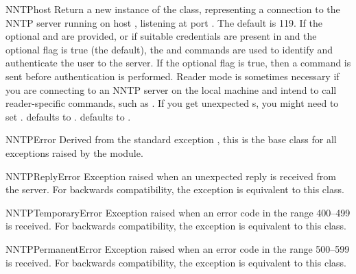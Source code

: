 \begin{classdesc}{NNTP}{host}
Return a new instance of the  class, representing a
connection to the NNTP server running on host , listening at
port .  The default  is 119.  If the optional
 and  are provided, 
or if suitable credentials are present in  and the
optional flag  is true (the default),
the  and  commands are used to
identify and authenticate the user to the server.  If the optional
flag  is true, then a  command is
sent before authentication is performed.  Reader mode is sometimes
necessary if you are connecting to an NNTP server on the local machine
and intend to call reader-specific commands, such as .  If
you get unexpected s, you might need to set
.   defaults to .
 defaults to .

\end{classdesc}

\begin{classdesc}{NNTPError}{}
Derived from the standard exception , this is the base
class for all exceptions raised by the  module.
\end{classdesc}

\begin{classdesc}{NNTPReplyError}{}
Exception raised when an unexpected reply is received from the
server.  For backwards compatibility, the exception 
is equivalent to this class.
\end{classdesc}

\begin{classdesc}{NNTPTemporaryError}{}
Exception raised when an error code in the range 400--499 is
received.  For backwards compatibility, the exception
 is equivalent to this class.
\end{classdesc}

\begin{classdesc}{NNTPPermanentError}{}
Exception raised when an error code in the range 500--599 is
received.  For backwards compatibility, the exception
 is equivalent to this class.
\end{classdesc}

